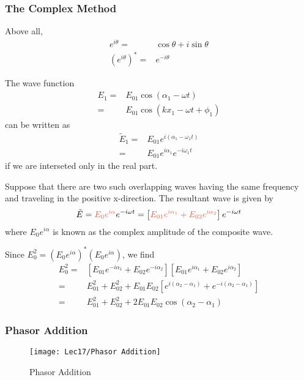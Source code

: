 \subsubsection{The Complex Method}
Above all, 
\begin{align*}
    e^{i\theta}=&\cos\theta+i\sin\theta\\
    (e^{i\theta})^*=&e^{-i\theta}
\end{align*}

The wave function
\begin{align*}
    E_1=&E_{01}\cos\left( \alpha_1-\omega t \right)\\
    =&E_{01}\cos\left( kx_1-\omega t +\phi_1\right)
\end{align*}
can be written as 
\begin{align*}
    \tilde{E}_1=&E_{01}e^{i(\alpha_1-\omega_1 t)}\\
    =&E_{01}e^{i\alpha_1}e^{-i\omega_1 t}
\end{align*}
if we are interseted only in the real part. 

Suppose that there are two such overlapping waves having the same frequency and traveling in the positive x-direction. The resultant wave is given by
\begin{align*}
    \tilde{E}=\highlight{E_{0}e^{i\alpha}}e^{-i\omega t}=\left[ \highlight{E_{01}e^{i\alpha_1}+E_{02}e^{i\alpha_2}} \right]e^{-i\omega t}
\end{align*}
where $E_{0}e^{i\alpha}$ is known as the complex amplitude of the composite wave. 

Since $E_0^2=\left( E_0e^{i\alpha} \right)^*\left(E_0e^{i\alpha}\right)$,  we find
\begin{align*}
    E_0^2=&\left[ E_{01}e^{-i\alpha_1}+E_{02}e^{-i\alpha_2} \right]\left[ E_{01}e^{i\alpha_1}+E_{02}e^{i\alpha_2} \right]\\
    =&E_{01}^2+E_{02}^2+E_{01}E_{02}\left[ e^{i(\alpha_2-\alpha_1)} + e^{-i(\alpha_2-\alpha_1)} \right]\\
    =&E_{01}^2+E_{02}^2+2E_{01}E_{02}\cos(\alpha_2-\alpha_1)
\end{align*}

\subsubsection{Phasor Addition}

\begin{figure}[H]
    \centering
    \texttt{[image: Lec17/Phasor Addition]}
    \caption{Phasor Addition}
\end{figure}


